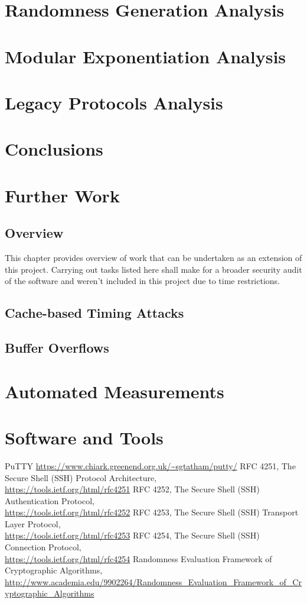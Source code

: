 \documentclass{report}
\begin{document}
\chapter{Randomness Generation Analysis}
\chapter{Modular Exponentiation Analysis}
\chapter{Legacy Protocols Analysis}
\chapter{Conclusions}
\chapter{Further Work}
\section{Overview}
This chapter provides overview of work that can be undertaken as an extension of this project. Carrying out tasks listed here shall make for a broader security audit of the software and weren't included in this project due to time restrictions.
\section{Cache-based Timing Attacks}
\section{Buffer Overflows}
\begin{appendices}
\chapter{Automated Measurements}
\chapter{Software and Tools}
\end{appendices}
\begin{thebibliography}{9}
PuTTY
\url{https://www.chiark.greenend.org.uk/~sgtatham/putty/}
RFC 4251, The Secure Shell (SSH) Protocol Architecture,\\
\url{https://tools.ietf.org/html/rfc4251}
RFC 4252, The Secure Shell (SSH) Authentication Protocol,\\  \url{https://tools.ietf.org/html/rfc4252}
RFC 4253, The Secure Shell (SSH) Transport Layer Protocol,\\ \url{https://tools.ietf.org/html/rfc4253}
RFC 4254, The Secure Shell (SSH) Connection Protocol,\\ \url{https://tools.ietf.org/html/rfc4254}
Randomness Evaluation Framework of Cryptographic Algorithms,\\
\url{http://www.academia.edu/9902264/Randomness_Evaluation_Framework_of_Cryptographic_Algorithms}
\end{thebibliography}
\listoffigures
\end{document}
